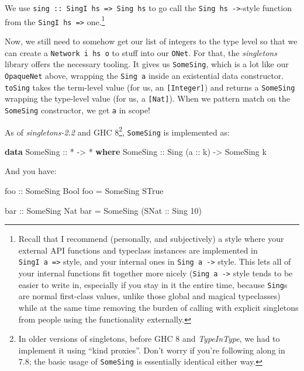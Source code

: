 \documentclass[]{article}
\newenvironment{Shaded}{}{}
\newcommand{\KeywordTok}[1]{\textcolor[rgb]{0.00,0.44,0.13}{\textbf{{#1}}}}
\newcommand{\DataTypeTok}[1]{\textcolor[rgb]{0.56,0.13,0.00}{{#1}}}
\newcommand{\DecValTok}[1]{\textcolor[rgb]{0.25,0.63,0.44}{{#1}}}
\newcommand{\OtherTok}[1]{\textcolor[rgb]{0.00,0.44,0.13}{{#1}}}
\newcommand{\FunctionTok}[1]{\textcolor[rgb]{0.02,0.16,0.49}{{#1}}}
\newcommand{\NormalTok}[1]{{#1}}
\begin{document}
We use \texttt{sing\ ::\ SingI\ hs\ =\textgreater{}\ Sing\ hs} to go call the
\texttt{Sing\ hs\ -\textgreater{}}-style function from the
\texttt{SingI\ hs\ =\textgreater{}} one.\footnote{Recall that I recommend
  (personally, and subjectively) a style where your external API functions and
  typeclass instances are implemented in \texttt{SingI\ a\ =\textgreater{}}
  style, and your internal ones in \texttt{Sing\ a\ -\textgreater{}} style. This
  lets all of your internal functions fit together more nicely
  (\texttt{Sing\ a\ -\textgreater{}} style tends to be easier to write in,
  especially if you stay in it the entire time, because \texttt{Sing}s are
  normal first-class values, unlike those global and magical typeclasses) while
  at the same time removing the burden of calling with explicit singletons from
  people using the functionality externally.}

Now, we still need to somehow get our list of integers to the type level so that
we can create a \texttt{Network\ i\ hs\ o} to stuff into our \texttt{ONet}. For
that, the \emph{singletons} library offers the necessary tooling. It gives us
\texttt{SomeSing}, which is a lot like our \texttt{OpaqueNet} above, wrapping
the \texttt{Sing\ a} inside an existential data constructor. \texttt{toSing}
takes the term-level value (for us, an \texttt{{[}Integer{]}}) and returns a
\texttt{SomeSing} wrapping the type-level value (for us, a \texttt{{[}Nat{]}}).
When we pattern match on the \texttt{SomeSing} constructor, we get \texttt{a} in
scope!

As of \emph{singletons-2.2} and GHC 8\footnote{In older versions of singletons,
  before GHC 8 and \emph{TypeInType}, we had to implement it using ``kind
  proxies''. Don't worry if you're following along in 7.8; the basic usage of
  \texttt{SomeSing} is essentially identical either way.}, \texttt{SomeSing} is
implemented as:

\begin{Shaded}
\begin{Highlighting}[]
\KeywordTok{data} \DataTypeTok{SomeSing}\OtherTok{ ::} \FunctionTok{*} \OtherTok{->} \FunctionTok{*} \KeywordTok{where}
    \DataTypeTok{SomeSing}\OtherTok{ ::} \DataTypeTok{Sing} \NormalTok{(}\OtherTok{a ::} \NormalTok{k) }\OtherTok{->} \DataTypeTok{SomeSing} \NormalTok{k}
\end{Highlighting}
\end{Shaded}

And you have:

\begin{Shaded}
\begin{Highlighting}[]
\OtherTok{foo ::} \DataTypeTok{SomeSing} \DataTypeTok{Bool}
\NormalTok{foo }\FunctionTok{=} \DataTypeTok{SomeSing} \DataTypeTok{STrue}

\OtherTok{bar ::} \DataTypeTok{SomeSing} \DataTypeTok{Nat}
\NormalTok{bar }\FunctionTok{=} \DataTypeTok{SomeSing} \NormalTok{(}\DataTypeTok{SNat}\OtherTok{ ::} \DataTypeTok{Sing} \DecValTok{10}\NormalTok{)}
\end{Highlighting}
\end{Shaded}
\end{document}
